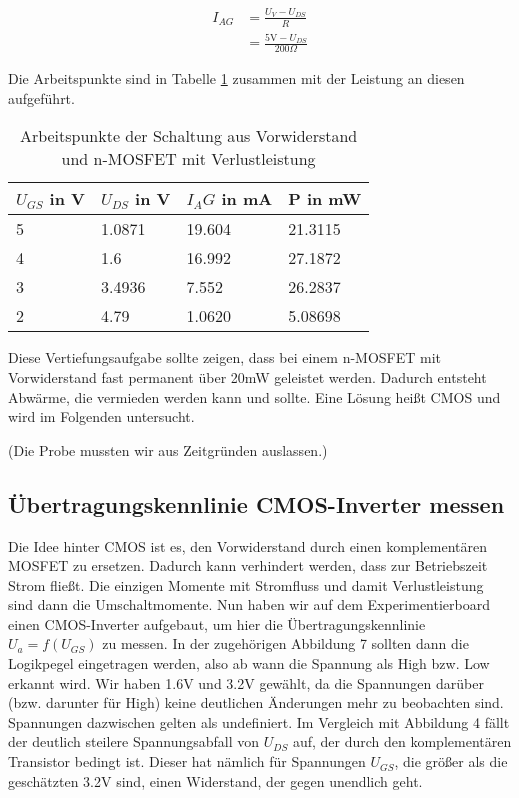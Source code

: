 \documentclass[12pt,a4paper]{scrartcl}
\begin{document}
\begin{align*}
I_{AG} & = \frac{U_V - U_{DS}}{R} \\ 
& = \frac{5\text{V} - U_{DS}}{200\Omega}
\end{align*}

Die Arbeitspunkte sind in Tabelle \ref{tab:arbeitspunkte} zusammen mit der Leistung an diesen aufgef\"uhrt.

\begin{table}[h]
    \centering
    \begin{tabular}{l|l|l|l}
    \hline
    $U_{GS}$ in V & $U_{DS}$ in V     & $I_AG$ in mA  & P in mW \\
    \hline
    5             & 1.0871            & 19.604        & 21.3115 \\
    4             & 1.6               & 16.992        & 27.1872 \\
    3             & 3.4936            & 7.552         & 26.2837 \\
    2             & 4.79              & 1.0620        & 5.08698 \\
    \hline
    \end{tabular}
    \caption{Arbeitspunkte der Schaltung aus Vorwiderstand und n-MOSFET mit Verlustleistung}
    \label{tab:arbeitspunkte}
\end{table}

Diese Vertiefungsaufgabe sollte zeigen, dass bei einem n-MOSFET mit Vorwiderstand fast permanent \"uber 20mW geleistet werden.
Dadurch entsteht Abw\"arme, die vermieden werden kann und sollte.
Eine L\"osung hei\ss t CMOS und wird im Folgenden untersucht.

(Die Probe mussten wir aus Zeitgr\"unden auslassen.)

\subsection{\"Ubertragungskennlinie CMOS-Inverter messen}
\label{invertermessen}
Die Idee hinter CMOS ist es, den Vorwiderstand durch einen komplement\"aren MOSFET zu ersetzen.
Dadurch kann verhindert werden, dass zur Betriebszeit Strom flie\ss t.
Die einzigen Momente mit Stromfluss und damit Verlustleistung sind dann die Umschaltmomente.
Nun haben wir auf dem Experimentierboard einen CMOS-Inverter aufgebaut, um hier die \"Ubertragungskennlinie $U_a=f(U_{GS})$ zu messen.
In der zugeh\"origen Abbildung 7 sollten dann die Logikpegel eingetragen werden, also ab wann die Spannung als High bzw. Low erkannt wird.
Wir haben 1.6V und 3.2V gew\"ahlt, da die Spannungen dar\"uber (bzw. darunter f\"ur High) keine deutlichen \"Anderungen mehr zu beobachten sind.
Spannungen dazwischen gelten als undefiniert.
Im Vergleich mit Abbildung 4 f\"allt der deutlich steilere Spannungsabfall von $U_{DS}$ auf, der durch den komplement\"aren Transistor bedingt ist.
Dieser hat n\"amlich f\"ur Spannungen $U_{GS}$, die gr\"o\ss er als die gesch\"atzten 3.2V sind, einen Widerstand, der gegen unendlich geht.
\end{document}
